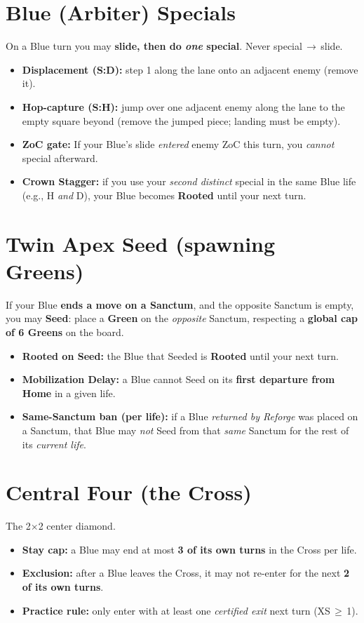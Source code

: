 \documentclass[11pt]{article}
\begin{document}
\section*{Blue (Arbiter) Specials}
On a Blue turn you may \textbf{slide, then do \emph{one} special}. Never special\,$\to$\,slide.
\begin{itemize}
  \item \textbf{Displacement (S:D):} step 1 along the lane onto an adjacent enemy (remove it).
  \item \textbf{Hop-capture (S:H):} jump over one adjacent enemy along the lane to the empty square beyond (remove the jumped piece; landing must be empty).
  \item \textbf{ZoC gate:} If your Blue’s slide \emph{entered} enemy ZoC this turn, you \emph{cannot} special afterward.
  \item \textbf{Crown Stagger:} if you use your \emph{second distinct} special in the same Blue life (e.g., H \emph{and} D), your Blue becomes \textbf{Rooted} until your next turn.
\end{itemize}

\section*{Twin Apex Seed (spawning Greens)}
If your Blue \textbf{ends a move on a Sanctum}, and the opposite Sanctum is empty, you may \textbf{Seed}: place a \textbf{Green} on the \emph{opposite} Sanctum, respecting a \textbf{global cap of 6 Greens} on the board.
\begin{itemize}
  \item \textbf{Rooted on Seed:} the Blue that Seeded is \textbf{Rooted} until your next turn.
  \item \textbf{Mobilization Delay:} a Blue cannot Seed on its \textbf{first departure from Home} in a given life.
  \item \textbf{Same-Sanctum ban (per life):} if a Blue \emph{returned by Reforge} was placed on a Sanctum, that Blue may \emph{not} Seed from that \emph{same} Sanctum for the rest of its \emph{current life}.
\end{itemize}

\section*{Central Four (the Cross)}
The 2$\times$2 center diamond.
\begin{itemize}
  \item \textbf{Stay cap:} a Blue may end at most \textbf{3 of its own turns} in the Cross per life.
  \item \textbf{Exclusion:} after a Blue leaves the Cross, it may not re-enter for the next \textbf{2 of its own turns}.
  \item \textbf{Practice rule:} only enter with at least one \emph{certified exit} next turn (XS\,$\ge$\,1).
\end{itemize}
\end{document}
